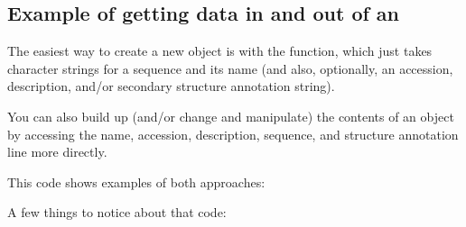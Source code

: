 




\subsection{Example of getting data in and out of an }

The easiest way to create a new  object is with the
 function, which just takes character
strings for a sequence and its name (and also, optionally, an
accession, description, and/or secondary structure annotation string).

You can also build up (and/or change and manipulate) the contents of
an  object by accessing the name, accession,
description, sequence, and structure annotation line more directly.

This code shows examples of both approaches:



A few things to notice about that code:

